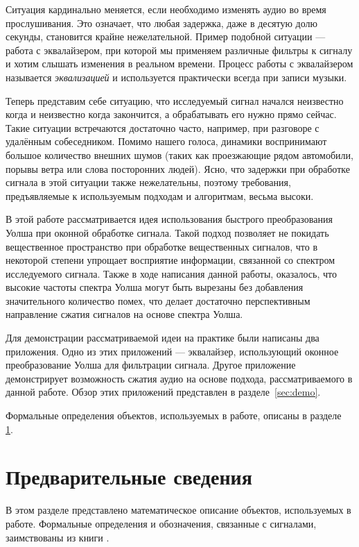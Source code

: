 \documentclass{matmex-diploma-custom}
\begin{document}
Ситуация кардинально меняется, если необходимо изменять аудио во время 
прослушивания. Это означает, что любая задержка, даже в десятую долю секунды,
становится крайне нежелательной. 
Пример подобной ситуации --- работа с эквалайзером, при которой
мы применяем различные фильтры к сигналу и хотим слышать изменения в реальном времени.
Процесс работы с эквалайзером называется \emph{эквализацией} и используется 
практически всегда при записи музыки.

Теперь представим себе ситуацию, что исследуемый сигнал начался неизвестно когда
и неизвестно когда закончится, а обрабатывать его нужно прямо сейчас. Такие ситуации
встречаются достаточно часто, например, при разговоре с удалённым 
собеседником. Помимо нашего голоса, динамики воспринимают большое количество внешних
шумов (таких как проезжающие рядом автомобили, порывы ветра или слова посторонних людей).
Ясно, что задержки при обработке сигнала в этой ситуации также нежелательны, поэтому
требования, предъявляемые к используемым подходам и алгоритмам, весьма высоки.

В этой работе рассматривается идея использования быстрого преобразования 
Уолша при оконной обработке сигнала. Такой подход позволяет не покидать вещественное
пространство при обработке вещественных сигналов, что в некоторой степени упрощает
восприятие информации, связанной со спектром исследуемого сигнала.
Также в ходе написания данной работы, оказалось, что высокие частоты спектра Уолша 
могут быть вырезаны без добавления значительного количество помех, что делает
достаточно перспективным направление сжатия сигналов на основе спектра Уолша.

Для демонстрации рассматриваемой идеи на практике были написаны два 
приложения. Одно из этих приложений --- эквалайзер, использующий
оконное преобразование Уолша для фильтрации сигнала. Другое приложение демонстрирует
возможность сжатия аудио на основе подхода, рассматриваемого в данной работе. 
Обзор этих приложений представлен в разделе~\ref{sec:demo}.

Формальные определения объектов, используемых в работе, описаны в разделе~
\ref{sec:preliminary}.


\section{Предварительные сведения}
\label{sec:preliminary}
В этом разделе представлено математическое описание объектов, используемых в работе.
Формальные определения и обозначения, связанные с сигналами,
заимствованы из книги \cite{dha}.
\end{document}
